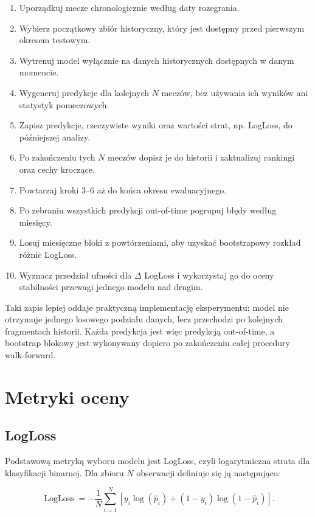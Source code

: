 \begin{enumerate}
    \item Uporządkuj mecze chronologicznie według daty rozegrania.
    \item Wybierz początkowy zbiór historyczny, który jest dostępny przed pierwszym okresem testowym.
    \item Wytrenuj model wyłącznie na danych historycznych dostępnych w danym momencie.
    \item Wygeneruj predykcje dla kolejnych $N$ meczów, bez używania ich wyników ani statystyk pomeczowych.
    \item Zapisz predykcje, rzeczywiste wyniki oraz wartości strat, np. LogLoss, do późniejszej analizy.
    \item Po zakończeniu tych $N$ meczów dopisz je do historii i zaktualizuj rankingi oraz cechy kroczące.
    \item Powtarzaj kroki 3--6 aż do końca okresu ewaluacyjnego.
    \item Po zebraniu wszystkich predykcji out-of-time pogrupuj błędy według miesięcy.
    \item Losuj miesięczne bloki z powtórzeniami, aby uzyskać bootstrapowy rozkład różnic LogLoss.
    \item Wyznacz przedział ufności dla $\Delta$ LogLoss i wykorzystaj go do oceny stabilności przewagi jednego modelu nad drugim.
\end{enumerate}

Taki zapis lepiej oddaje praktyczną implementację eksperymentu: model nie otrzymuje jednego losowego podziału danych, lecz przechodzi po kolejnych fragmentach historii. Każda predykcja jest więc predykcją out-of-time, a bootstrap blokowy jest wykonywany dopiero po zakończeniu całej procedury walk-forward.

\section{Metryki oceny}

\subsection{LogLoss}

Podstawową metryką wyboru modelu jest LogLoss, czyli logarytmiczna strata dla klasyfikacji binarnej. Dla zbioru \(N\) obserwacji definiuje się ją następująco:

\begin{equation}
    \operatorname{LogLoss} = -\frac{1}{N}\sum_{i=1}^{N}\left[y_i \log(\hat{p}_i) + (1-y_i)\log(1-\hat{p}_i)\right].
\end{equation}

